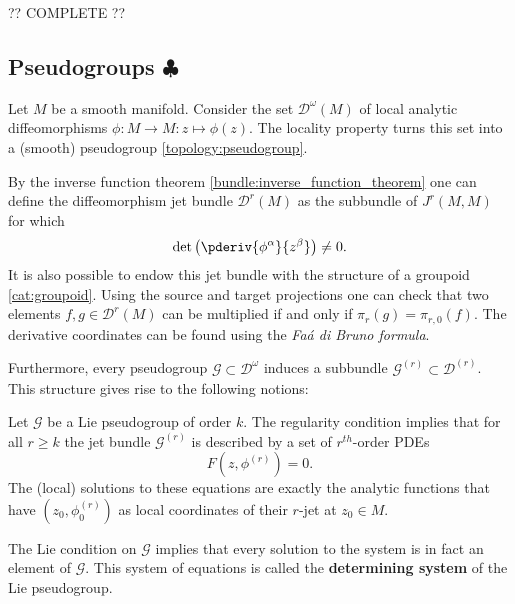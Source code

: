     ?? COMPLETE ??

\subsection{\texorpdfstring{Pseudogroups $\clubsuit$}{Pseudogroups}}

    \begin{example}
        Let $M$ be a smooth manifold. Consider the set $\mathcal{D}^\omega(M)$ of local analytic diffeomorphisms $\phi:M\rightarrow M:z\mapsto\phi(z)$. The locality property turns this set into a (smooth) pseudogroup \ref{topology:pseudogroup}.

        By the inverse function theorem \ref{bundle:inverse_function_theorem} one can define the diffeomorphism jet bundle $\mathcal{D}^r(M)$ as the subbundle of $J^r(M,M)$ for which \[\det\left(\pderiv{\phi^\alpha}{z^\beta}\right)\neq0.\] It is also possible to endow this jet bundle with the structure of a groupoid \ref{cat:groupoid}. Using the source and target projections one can check that two elements $f,g\in\mathcal{D}^r(M)$ can be multiplied if and only if $\pi_r(g)=\pi_{r,0}(f)$. The derivative coordinates can be found using the \textit{Fa\'a di Bruno formula}.
    \end{example}
    Furthermore, every pseudogroup $\mathcal{G}\subset\mathcal{D}^\omega$ induces a subbundle $\mathcal{G}^{(r)}\subset\mathcal{D}^{(r)}$. This structure gives rise to the following notions:
    \begin{property}
        Let $\mathcal{G}$ be a Lie pseudogroup of order $k$. The regularity condition implies that for all $r\geq k$ the jet bundle $\mathcal{G}^{(r)}$ is described by a set of $r^{th}$-order PDEs \[F\left(z,\phi^{(r)}\right) = 0.\] The (local) solutions to these equations are exactly the analytic functions that have $(z_0,\phi^{(r)}_0)$ as local coordinates of their $r$-jet at $z_0\in M$.

        The Lie condition on $\mathcal{G}$ implies that every solution to the system is in fact an element of $\mathcal{G}$. This system of equations is called the \textbf{determining system} of the Lie pseudogroup.
    \end{property}

